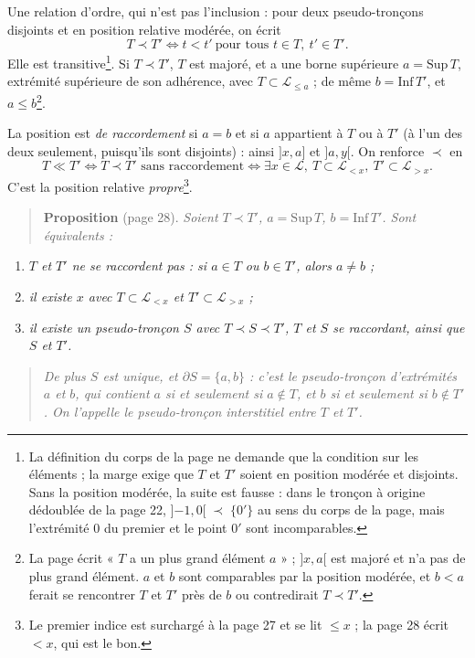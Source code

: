\documentclass[11pt,a4paper]{article}
\begin{document}
Une relation d'ordre, qui n'est pas l'inclusion : pour deux pseudo-tronçons
disjoints et en position relative modérée, on écrit
\[
T \prec T' \iff t < t' \ \text{pour tous } t \in T,\ t' \in T' .
\]
Elle est transitive\footnote{La définition du corps de la page ne demande que
la condition sur les éléments ; la marge exige que $T$ et $T'$ soient en
position modérée et disjoints. Sans la position modérée, la suite est fausse :
dans le tronçon à origine dédoublée de la page 22, $]{-1}, 0[ \;\prec\; \{0'\}$
au sens du corps de la page, mais l'extrémité $0$ du premier et le point $0'$
sont incomparables.}. Si $T \prec T'$, $T$ est majoré, et a une borne
supérieure $a = \mathrm{Sup}\, T$, extrémité supérieure de son adhérence, avec
$T \subset \mathcal{L}_{\leq a}$ ; de même $b = \mathrm{Inf}\, T'$, et $a \leq
b$\footnote{La page écrit « $T$ a un plus grand élément $a$ » ; $]x,a[$ est
majoré et n'a pas de plus grand élément. $a$ et $b$ sont comparables par la
position modérée, et $b < a$ ferait se rencontrer $T$ et $T'$ près de $b$ ou
contredirait $T \prec T'$.}.

La position est \emph{de raccordement} si $a = b$ et si $a$ appartient à $T$ ou
à $T'$ (à l'un des deux seulement, puisqu'ils sont disjoints) : ainsi $]x,a]$
et $]a,y[$. On renforce $\prec$ en
\[
T \ll T' \iff T \prec T' \text{ sans raccordement} \iff \exists x \in
\mathcal{L},\ T \subset \mathcal{L}_{<x},\ T' \subset \mathcal{L}_{>x}.
\]
C'est la position relative \emph{propre}\footnote{Le premier indice est surchargé
à la page 27 et se lit $\leq x$ ; la page 28 écrit $<x$, qui est le bon.}.

\begin{quote}
\textbf{Proposition} (page 28). \emph{Soient $T \prec T'$, $a = \mathrm{Sup}\,
T$, $b = \mathrm{Inf}\, T'$. Sont équivalents :}
\end{quote}
\begin{enumerate}
\item[a)] \emph{$T$ et $T'$ ne se raccordent pas : si $a \in T$ ou $b \in T'$,
alors $a \neq b$ ;}
\item[b)] \emph{il existe $x$ avec $T \subset \mathcal{L}_{<x}$ et $T' \subset
\mathcal{L}_{>x}$ ;}
\item[c)] \emph{il existe un pseudo-tronçon $S$ avec $T \prec S \prec T'$, $T$
et $S$ se raccordant, ainsi que $S$ et $T'$.}
\end{enumerate}
\begin{quote}
\emph{De plus $S$ est unique, et $\partial S = \{a, b\}$ : c'est le
pseudo-tronçon d'extrémités $a$ et $b$, qui contient $a$ si et seulement si $a
\notin T$, et $b$ si et seulement si $b \notin T'$. On l'appelle le
\emph{pseudo-tronçon interstitiel} entre $T$ et $T'$.}
\end{quote}
\end{document}
